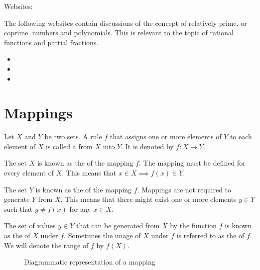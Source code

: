 \documentclass[letterpaper,10pt,english]{jupyterBook}
\begin{document}
\sphinxAtStartPar
Websites:

\sphinxAtStartPar
The following websites contain discussions of the concept of relatively prime, or co\sphinxhyphen{}prime, numbers and polynomials. This is relevant to the topic of rational functions and partial fractions.
\begin{itemize}
\item {} 
\sphinxAtStartPar
{}

\item {} 
\sphinxAtStartPar
{}

\item {} 
\sphinxAtStartPar
{}

\end{itemize}


\section{Mappings}
\label{\detokenize{03.mappings_functions_correspondences:mappings}}
\sphinxAtStartPar
Let \(X\) and \(Y\) be two sets. A rule \(f\) that assigns one or more elements of \(Y\) to each element of \(X\) is called a  from \(X\) into \(Y\). It is denoted by \(f: X \rightarrow Y\).

\sphinxAtStartPar
The set \(X\) is known as the  of the mapping \(f\). The mapping must be defined for every element of \(X\). This means that \(x \in X \implies f(x) \in Y\).

\sphinxAtStartPar
The set \(Y\) is known as the  of the mapping \(f\). Mappings are not required to generate \(Y\) from \(X\). This means that there might exist one or more elements \(y \in Y\) such that \(y \ne f(x)\) for any \(x \in X\).

\sphinxAtStartPar
The set of values \(y \in Y\) that can be generated from \(X\) by the function \(f\) is known as the  of \(X\) under \(f\). Sometimes the image of \(X\) under \(f\) is referred to as the  of \(f\). We will denote the range of \(f\) by \(f(X)\).

\begin{figure}[htbp]
\centering
\capstart

\noindent{}
\caption{Diagrammatic representation of a mapping}\label{\detokenize{03.mappings_functions_correspondences:id2}}\end{figure}
\end{document}
